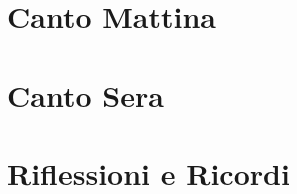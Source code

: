 \part{Canto Mattina}



\cleartorecto
\part{Canto Sera}

%

\cleartorecto
\part{Riflessioni e Ricordi}

%
%

